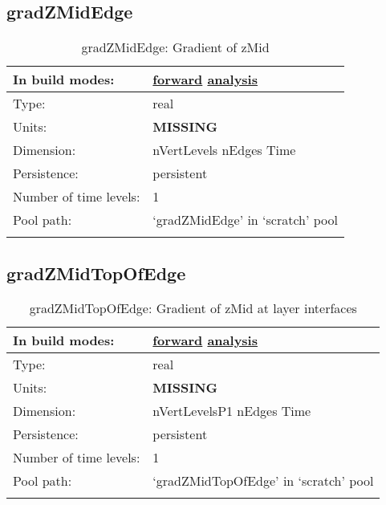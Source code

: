 \subsection[gradZMidEdge]{gradZMidEdge}
\label{subsec:var_sec_scratch_gradZMidEdge}
\begin{center}
\begin{longtable}{| p{2.0in} | p{4.0in} |}
        \hline 
        In build modes: & \hyperref[subsec:forward_var_tab_scratch]{forward} \hyperref[subsec:analysis_var_tab_scratch]{analysis} \\
        \hline 
        Type: & real \\
        \hline 
        Units: & {\bf \color{red} MISSING} \\
        \hline 
        Dimension: & nVertLevels nEdges Time \\
        \hline 
        Persistence: & persistent \\
        \hline 
        Number of time levels: & 1 \\
        \hline 
            Pool path: & `gradZMidEdge' in `scratch' pool \\
		 \hline 
    \caption{gradZMidEdge: Gradient of zMid}
\end{longtable}
\end{center}
\subsection[gradZMidTopOfEdge]{gradZMidTopOfEdge}
\label{subsec:var_sec_scratch_gradZMidTopOfEdge}
\begin{center}
\begin{longtable}{| p{2.0in} | p{4.0in} |}
        \hline 
        In build modes: & \hyperref[subsec:forward_var_tab_scratch]{forward} \hyperref[subsec:analysis_var_tab_scratch]{analysis} \\
        \hline 
        Type: & real \\
        \hline 
        Units: & {\bf \color{red} MISSING} \\
        \hline 
        Dimension: & nVertLevelsP1 nEdges Time \\
        \hline 
        Persistence: & persistent \\
        \hline 
        Number of time levels: & 1 \\
        \hline 
            Pool path: & `gradZMidTopOfEdge' in `scratch' pool \\
		 \hline 
    \caption{gradZMidTopOfEdge: Gradient of zMid at layer interfaces}
\end{longtable}
\end{center}

